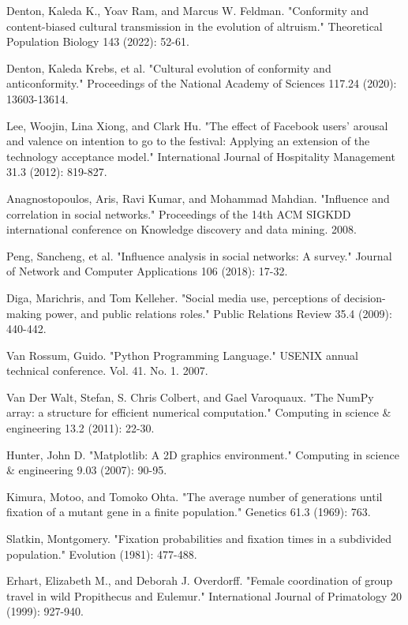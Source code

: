 \documentclass[12pt]{extarticle}
\begin{document}
\begin{thebibliography}{}
Denton, Kaleda K., Yoav Ram, and Marcus W. Feldman. "Conformity and content-biased cultural transmission in the evolution of altruism." Theoretical Population Biology 143 (2022): 52-61.

Denton, Kaleda Krebs, et al. "Cultural evolution of conformity and anticonformity." Proceedings of the National Academy of Sciences 117.24 (2020): 13603-13614.

Lee, Woojin, Lina Xiong, and Clark Hu. "The effect of Facebook users’ arousal and valence on intention to go to the festival: Applying an extension of the technology acceptance model." International Journal of Hospitality Management 31.3 (2012): 819-827.

Anagnostopoulos, Aris, Ravi Kumar, and Mohammad Mahdian. "Influence and correlation in social networks." Proceedings of the 14th ACM SIGKDD international conference on Knowledge discovery and data mining. 2008.

Peng, Sancheng, et al. "Influence analysis in social networks: A survey." Journal of Network and Computer Applications 106 (2018): 17-32.

Diga, Marichris, and Tom Kelleher. "Social media use, perceptions of decision-making power, and public relations roles." Public Relations Review 35.4 (2009): 440-442.

Van Rossum, Guido. "Python Programming Language." USENIX annual technical conference. Vol. 41. No. 1. 2007.

Van Der Walt, Stefan, S. Chris Colbert, and Gael Varoquaux. "The NumPy array: a structure for efficient numerical computation." Computing in science \& engineering 13.2 (2011): 22-30.

Hunter, John D. "Matplotlib: A 2D graphics environment." Computing in science \& engineering 9.03 (2007): 90-95.

Kimura, Motoo, and Tomoko Ohta. "The average number of generations until fixation of a mutant gene in a finite population." Genetics 61.3 (1969): 763.

Slatkin, Montgomery. "Fixation probabilities and fixation times in a subdivided population." Evolution (1981): 477-488.

Erhart, Elizabeth M., and Deborah J. Overdorff. "Female coordination of group travel in wild Propithecus and Eulemur." International Journal of Primatology 20 (1999): 927-940.


\end{thebibliography}
\end{document}
